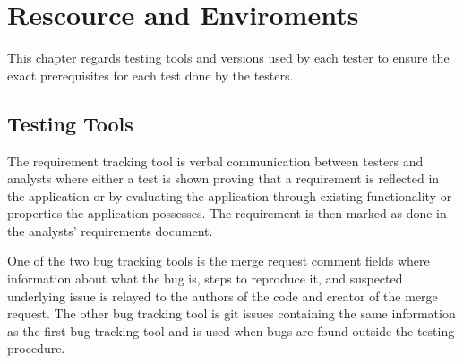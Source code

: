 \section{Rescource and Enviroments}
This chapter regards testing tools and versions used by each tester to ensure the exact prerequisites for each test done by the testers.


\subsection{Testing Tools}
The requirement tracking tool is verbal communication between testers and analysts where either a test is shown proving that a requirement is reflected in the application or by evaluating the application through existing functionality or properties the application possesses. The requirement is then marked as done in the analysts' requirements document.\newline


\noindent One of the two bug tracking tools is the merge request comment fields where information about what the bug is, steps to reproduce it, and suspected underlying issue is relayed to the authors of the code and creator of the merge request. The other bug tracking tool is git issues containing the same information as the first bug tracking tool and is used when bugs are found outside the testing procedure.\newline

